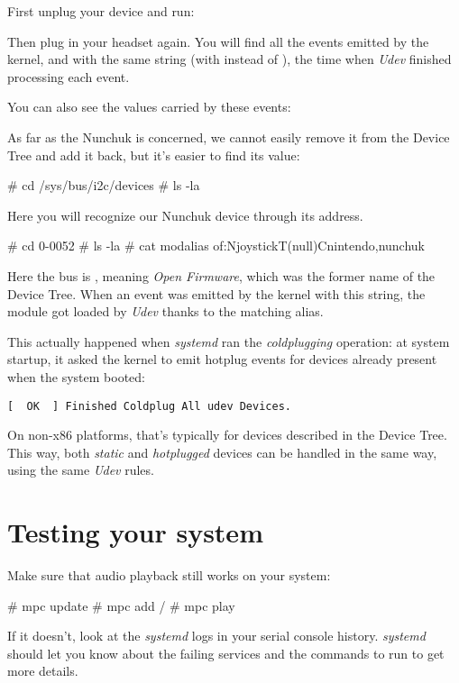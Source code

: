 First unplug your device and run:


Then plug in your headset again. You will find all the events emitted
by the kernel, and with the same string (with  instead of
), the time when {\em Udev} finished processing each event.

You can also see the  values carried by these events:


As far as the Nunchuk is concerned, we cannot easily remove it from the
Device Tree and add it back, but it's easier to find its 
value:

\begin{bashinput}
# cd /sys/bus/i2c/devices
# ls -la
\end{bashinput}

Here you will recognize our Nunchuk device through its 
address.

\begin{bashinput}
# cd 0-0052
# ls -la
# cat modalias
of:NjoystickT(null)Cnintendo,nunchuk
\end{bashinput}

Here the bus is , meaning {\em Open Firmware}, which
was the former name of the Device Tree. When an event was emitted by
the kernel with this  string, the  module
got loaded by {\em Udev} thanks to the matching alias.

This actually happened when {\em systemd} ran the {\em coldplugging}
operation: at system startup, it asked the kernel to emit hotplug events
for devices already present when the system booted:

\begin{verbatim}
[  OK  ] Finished Coldplug All udev Devices.
\end{verbatim}

On non-x86 platforms, that's typically for devices described in the
Device Tree. This way, both {\em static} and {\em hotplugged} devices
can be handled in the same way, using the same {\em Udev} rules.

\section{Testing your system}

Make sure that audio playback still works on your system:

\begin{bashinput}
# mpc update
# mpc add /
# mpc play
\end{bashinput}

If it doesn't, look at the {\em systemd} logs in your serial console
history. {\em systemd} should let you know about the failing services
and the commands to run to get more details.
